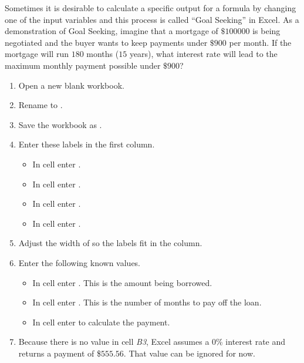 Sometimes it is desirable to calculate a specific output for a formula by changing one of the input variables and this process is called ``Goal Seeking'' in Excel. As a demonstration of Goal Seeking, imagine that a mortgage of $ \$100000 $ is being negotiated and the buyer wants to keep payments under $ \$900 $ per month. If the mortgage will run $ 180 $ months ($ 15 $ years), what interest rate will lead to the maximum monthly payment possible under $ \$900 $?

\begin{enumerate}
	\item Open a new blank workbook.
	\item Rename  to .
	\item Save the workbook as .
	\item Enter these labels in the first column.

	\begin{itemize}
		\item In cell  enter .
		\item In cell  enter .
		\item In cell  enter .
		\item In cell  enter .
	\end{itemize}

	\item Adjust the width of  so the labels fit in the column.
	\item Enter the following known values.

	\begin{itemize}
		\item In cell  enter . This is the amount being borrowed.
		\item In cell  enter . This is the number of months to pay off the loan. 
		\item In cell  enter  to calculate the payment. 
	\end{itemize}

	\item Because there is no value in cell \textit{B3}, Excel assumes a $ 0 $\% interest rate and returns a payment of \$$ 555.56 $. That value can be ignored for now.
\end{enumerate}

